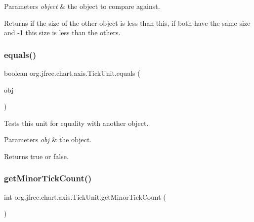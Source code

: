 \begin{DoxyParams}{Parameters}
{\em object} & the object to compare against.\\
\hline
\end{DoxyParams}
\begin{DoxyReturn}{Returns}
{} if the size of the other object is less than this, {} if both have the same size and {\ttfamily -\/1} this size is less than the others. 
\end{DoxyReturn}
\mbox{\label{classorg_1_1jfree_1_1chart_1_1axis_1_1_tick_unit_a27b0b5ec6b177c5285fa4da3f642ede2}} 
\subsubsection{\texorpdfstring{equals()}{equals()}}
{\footnotesize\ttfamily boolean org.\+jfree.\+chart.\+axis.\+Tick\+Unit.\+equals (\begin{DoxyParamCaption}\item[{Object}]{obj }\end{DoxyParamCaption})}

Tests this unit for equality with another object.


\begin{DoxyParams}{Parameters}
{\em obj} & the object.\\
\hline
\end{DoxyParams}
\begin{DoxyReturn}{Returns}
{\ttfamily true} or {\ttfamily false}. 
\end{DoxyReturn}
\mbox{\label{classorg_1_1jfree_1_1chart_1_1axis_1_1_tick_unit_ad9225c99e3a579eef24640709ed41547}} 
\subsubsection{\texorpdfstring{get\+Minor\+Tick\+Count()}{getMinorTickCount()}}
{\footnotesize\ttfamily int org.\+jfree.\+chart.\+axis.\+Tick\+Unit.\+get\+Minor\+Tick\+Count (\begin{DoxyParamCaption}{ }\end{DoxyParamCaption})}

